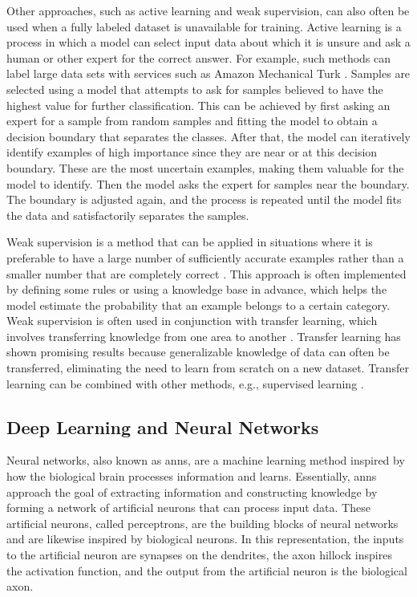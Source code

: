         Other approaches, such as active learning and weak supervision, can also often be used when a fully labeled dataset is unavailable for training. Active learning is a process in which a model can select input data about which it is unsure and ask a human or other expert for the correct answer. For example, such methods can label large data sets with services such as Amazon Mechanical Turk \cite{AmazonMechanicalTurk}. Samples are selected using a model that attempts to ask for samples believed to have the highest value for further classification. This can be achieved by first asking an expert for a sample from random samples and fitting the model to obtain a decision boundary that separates the classes. After that, the model can iteratively identify examples of high importance since they are near or at this decision boundary. These are the most uncertain examples, making them valuable for the model to identify. Then the model asks the expert for samples near the boundary. The boundary is adjusted again, and the process is repeated until the model fits the data and satisfactorily separates the samples.
        
        Weak supervision is a method that can be applied in situations where it is preferable to have a large number of sufficiently accurate examples rather than a smaller number that are completely correct \cite{hoffmannKnowledgeBasedWeakSupervision2011}. This approach is often implemented by defining some rules or using a knowledge base in advance, which helps the model estimate the probability that an example belongs to a certain category. Weak supervision is often used in conjunction with transfer learning, which involves transferring knowledge from one area to another \cite{wangSimVLMSimpleVisual2022}. Transfer learning has shown promising results because generalizable knowledge of data can often be transferred, eliminating the need to learn from scratch on a new dataset. Transfer learning can be combined with other methods, e.g., supervised learning \cite{zhuangComprehensiveSurveyTransfer2021}.
    
    \subsection{Deep Learning and Neural Networks} \label{sec:2_background_theory_deep_learning_and_neural_networks}
    Neural networks, also known as \glspl{ann}, are a machine learning method inspired by how the biological brain processes information and learns. Essentially, \glspl{ann} approach the goal of extracting information and constructing knowledge by forming a network of artificial neurons that can process input data. These artificial neurons, called perceptrons, are the building blocks of neural networks and are likewise inspired by biological neurons. In this representation, the inputs to the artificial neuron are synapses on the dendrites, the axon hillock inspires the activation function, and the output from the artificial neuron is the biological axon.
    
